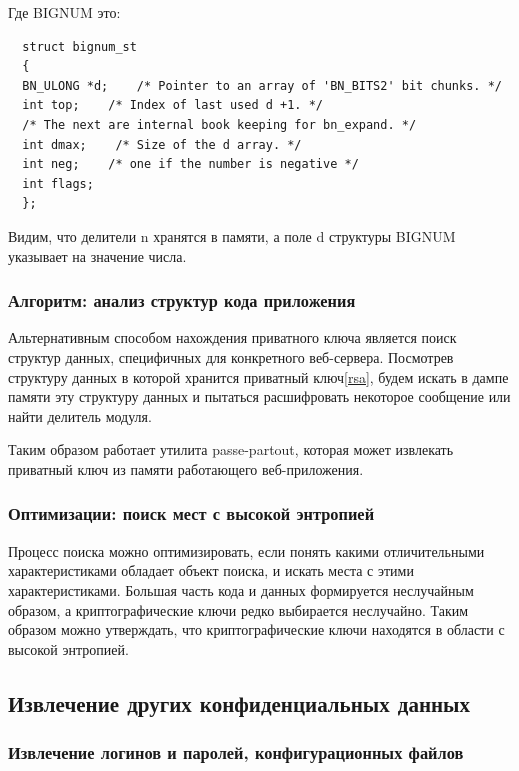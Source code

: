 \documentclass[20pt]{article}
\begin{document}
Где BIGNUM это:
\begin{lstlisting}
  struct bignum_st
  {
  BN_ULONG *d;    /* Pointer to an array of 'BN_BITS2' bit chunks. */
  int top;    /* Index of last used d +1. */
  /* The next are internal book keeping for bn_expand. */
  int dmax;    /* Size of the d array. */
  int neg;    /* one if the number is negative */
  int flags;
  };
\end{lstlisting}

Видим, что делители n хранятся в памяти, а поле d структуры BIGNUM указывает на
значение числа.

\subsubsection{Алгоритм: анализ структур кода приложения}

Альтернативным способом нахождения приватного ключа является поиск структур
данных, специфичных для конкретного веб-сервера. Посмотрев структуру данных в которой
хранится приватный ключ\ref{rsa}, будем искать в дампе памяти эту структуру данных
и пытаться расшифровать некоторое сообщение или найти делитель модуля.

Таким образом работает утилита passe-partout\cite{passe-partout}, которая может извлекать приватный ключ из
памяти работающего веб-приложения.

\subsubsection{Оптимизации: поиск мест с высокой энтропией}

Процесс поиска можно оптимизировать, если понять какими отличительными
характеристиками обладает объект поиска, и искать места с этими характеристиками.
Большая часть кода и данных формируется неслучайным образом, а криптографические
ключи редко выбирается неслучайно. Таким образом можно утверждать, что
криптографические ключи находятся в области с высокой энтропией.

\subsection{Извлечение других конфиденциальных данных}

\subsubsection{Извлечение логинов и паролей, конфигурационных файлов}
\end{document}
